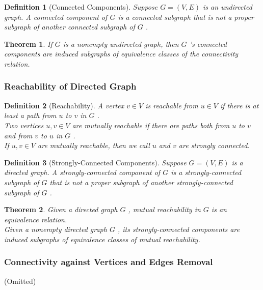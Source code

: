 \documentclass{ctexart}
\newcommand{\。}{．} %
\newenvironment{lvse}{
    \begin{tcolorbox}[enhanced, breakable, colback=qlv, boxrule=0pt, frame hidden,
        borderline west={0.7mm}{0.1mm}{slv}]
    }
    {\end{tcolorbox}}
\newenvironment{huangse}{
    \begin{tcolorbox}[enhanced, breakable, colback=qhuang, boxrule=0pt, frame hidden,
        borderline west={0.7mm}{0.1mm}{shuang}]
    }
    {\end{tcolorbox}}
\theoremstyle{t} %
\newtheorem{dyhj}{\color{slv} Definition}[subsection] %
\newtheorem{dlhj}{\color{shuang} Theorem}[subsection]
\newenvironment{dy}{\begin{lvse}\begin{dyhj}}{\end{dyhj}\end{lvse}}
\newenvironment{dl}{\begin{huangse}\begin{dlhj}}{\end{dlhj}\end{huangse}}
\begin{document}
\begin{dy}[Connected Components]
    Suppose  $ G = (V, E) $  is an undirected graph. A connected component of  $ G $  is a connected subgraph that is not a proper subgraph of another connected subgraph of  $ G $ .
\end{dy}

\begin{dl}
    If  $ G $  is a nonempty undirected graph, then  $ G $ 's connected components are induced subgraphs of equivalence classes of the connectivity relation.
\end{dl}

\subsubsection{Reachability of Directed Graph}

\begin{dy}[Reachability]
    A vertex  $ v \in V $  is reachable from  $ u \in V $  if there is at least a path from  $ u $  to  $ v $  in  $ G $ . \\
    Two vertices  $ u, v \in V $  are mutually reachable if there are paths both from  $ u $  to  $ v $  and from  $ v $  to  $ u $  in  $ G $ . \\
    If $u, v \in V$ are mutually reachable, then we call $u$ and $v$ are strongly connected.
\end{dy}

\begin{dy}[Strongly-Connected Components]
    Suppose  $ G = (V, E) $  is a directed graph. A strongly-connected component of  $ G $  is a strongly-connected subgraph of  $ G $  that is not a proper subgraph of another strongly-connected subgraph of  $ G $ .
\end{dy}

\begin{dl}
    Given a directed graph  $ G $ , mutual reachability in  $ G $  is an equivalence relation. \\
    Given a nonempty directed graph  $ G $ , its strongly-connected components are induced subgraphs of equivalence classes of mutual reachability.
\end{dl}

\subsubsection{Connectivity against Vertices and Edges Removal}

(Omitted)
\end{document}
